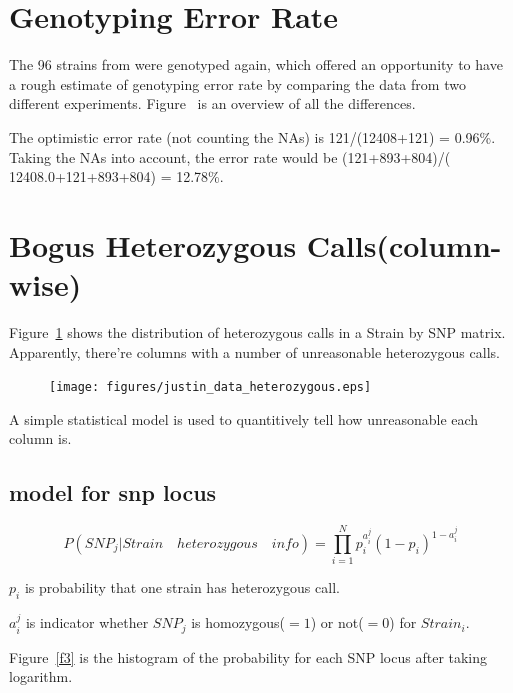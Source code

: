 \documentclass[a4paper,10pt]{article}
\begin{document}
\section{Genotyping Error Rate}
The 96 strains from \cite{Nordborg2005} were genotyped again, which offered an opportunity to have a rough estimate of genotyping error rate by comparing the data from two different experiments. Figure~ is an overview of all the differences.

The optimistic error rate (not counting the NAs) is 121/(12408+121) = 0.96\%. Taking the NAs into account, the error rate would be (121+893+804)/( 12408.0+121+893+804) = 12.78\%.


\section{Bogus Heterozygous Calls(column-wise)}
Figure~\ref{f2} shows the distribution of heterozygous calls in a Strain by SNP matrix. Apparently, there're columns with a number of unreasonable heterozygous calls.

\begin{figure}
\texttt{[image: figures/justin\_data\_heterozygous.eps]}
\caption{}\label{f2}
\end{figure}

A simple statistical model is used to quantitively tell how unreasonable each column is.

\subsection{model for snp locus}
\begin{equation}
P({SNP}_j|Strain\quad heterozygous\quad info) = \prod_{i=1}^{N} p_i^{a_i^j} (1-p_i)^{1-a_i^j}
\end{equation}

$p_i$ is probability that one strain has heterozygous call.

$a_i^j$ is indicator whether ${SNP}_j$ is homozygous($=1$) or not($=0$) for ${Strain}_i$.

Figure~\ref{f3} is the histogram of the probability for each SNP locus after taking logarithm.
\end{document}
